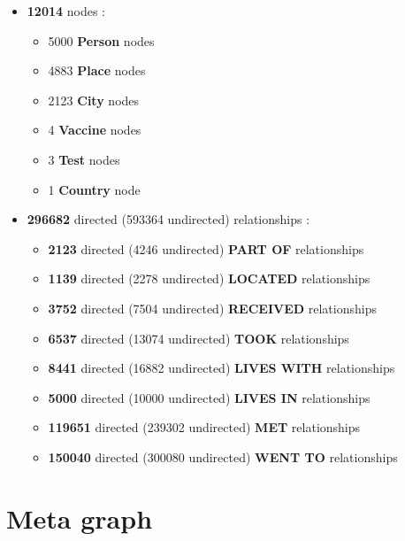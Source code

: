 \documentclass{article}[IEEEtran]
\begin{document}
\begin{itemize}
    \item \textbf{12014} nodes : 
    \begin{itemize}
        \item 5000 \textbf{Person} nodes
        \item 4883 \textbf{Place} nodes
        \item 2123 \textbf{City} nodes
        \item 4 \textbf{Vaccine} nodes
        \item 3 \textbf{Test} nodes
        \item 1 \textbf{Country} node
    \end{itemize}
    \item \textbf{296682} directed (593364 undirected) relationships : 
    \begin{itemize}
        \item \textbf{2123} directed (4246 undirected) \textbf{PART OF} relationships
        \item \textbf{1139} directed (2278 undirected) \textbf{LOCATED} relationships
        \item \textbf{3752} directed (7504 undirected) \textbf{RECEIVED} relationships
        \item \textbf{6537} directed (13074 undirected) \textbf{TOOK} relationships
        \item \textbf{8441} directed (16882 undirected) \textbf{LIVES WITH} relationships
        \item \textbf{5000} directed (10000 undirected) \textbf{LIVES IN} relationships
        \item \textbf{119651} directed (239302 undirected) \textbf{MET} relationships
        \item \textbf{150040} directed (300080 undirected) \textbf{WENT TO} relationships
       
    \end{itemize}
\end{itemize}

\section{Meta graph}
\end{document}
